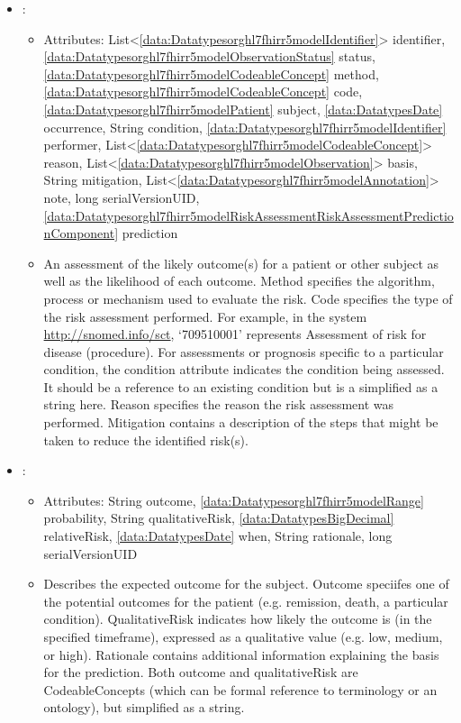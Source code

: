 \begin{itemize}[nolistsep,noitemsep]
\item {}: 
\begin{itemize}[noitemsep,nolistsep]
\item[] Attributes: List\textless{}\ref{data:Datatypesorghl7fhirr5modelIdentifier}\textgreater{} identifier, \ref{data:Datatypesorghl7fhirr5modelObservationStatus} status, \ref{data:Datatypesorghl7fhirr5modelCodeableConcept} method, \ref{data:Datatypesorghl7fhirr5modelCodeableConcept} code, \ref{data:Datatypesorghl7fhirr5modelPatient} subject, \ref{data:DatatypesDate} occurrence, String condition, \ref{data:Datatypesorghl7fhirr5modelIdentifier} performer, List\textless{}\ref{data:Datatypesorghl7fhirr5modelCodeableConcept}\textgreater{} reason, List\textless{}\ref{data:Datatypesorghl7fhirr5modelObservation}\textgreater{} basis, String mitigation, List\textless{}\ref{data:Datatypesorghl7fhirr5modelAnnotation}\textgreater{} note, long serialVersionUID, \ref{data:Datatypesorghl7fhirr5modelRiskAssessmentRiskAssessmentPredictionComponent} prediction
\item[] An assessment of the likely outcome(s) for a patient or other subject as well as the likelihood of each outcome.
Method specifies the algorithm, process or mechanism used to evaluate the risk.
Code specifies the type of the risk assessment performed.
For example, in the system  \url{http://snomed.info/sct}, `709510001' represents Assessment of risk for disease (procedure).
For assessments or prognosis specific to a particular condition, the condition attribute indicates the condition being assessed. It should be a reference to an existing condition but is a simplified as a string here.
Reason specifies the reason the risk assessment was performed.
Mitigation contains a description of the steps that might be taken to reduce the identified risk(s).
\end{itemize}

\item {}: 
\begin{itemize}[noitemsep,nolistsep]
\item[] Attributes: String outcome, \ref{data:Datatypesorghl7fhirr5modelRange} probability, String qualitativeRisk, \ref{data:DatatypesBigDecimal} relativeRisk, \ref{data:DatatypesDate} when, String rationale, long serialVersionUID
\item[] Describes the expected outcome for the subject.
Outcome speciifes one of the potential outcomes for the patient (e.g. remission, death,  a particular condition).
QualitativeRisk indicates how likely the outcome is (in the specified timeframe), expressed as a qualitative value (e.g. low, medium, or high).
Rationale contains additional information explaining the basis for the prediction.
Both outcome and qualitativeRisk are CodeableConcepts (which can be formal reference to terminology or an ontology), but simplified as a string.
\end{itemize}


\end{itemize}
